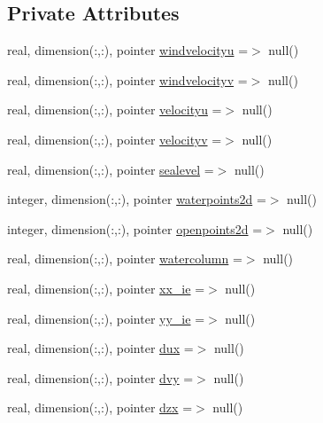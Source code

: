 \subsection*{Private Attributes}
\begin{DoxyCompactItemize}
\item 
real, dimension(\+:,\+:), pointer \mbox{\hyperlink{structmodulewaves_1_1t__external_ad495e0b450968a950cf15204f30f956c}{windvelocityu}} =$>$ null()
\item 
real, dimension(\+:,\+:), pointer \mbox{\hyperlink{structmodulewaves_1_1t__external_acf2611a1417aa702b38dc6164479e6f7}{windvelocityv}} =$>$ null()
\item 
real, dimension(\+:,\+:), pointer \mbox{\hyperlink{structmodulewaves_1_1t__external_a7216cc633e419c3c1b6240ae25a0aed1}{velocityu}} =$>$ null()
\item 
real, dimension(\+:,\+:), pointer \mbox{\hyperlink{structmodulewaves_1_1t__external_a186ce44dd9be393561f85a4c2bfd91ed}{velocityv}} =$>$ null()
\item 
real, dimension(\+:,\+:), pointer \mbox{\hyperlink{structmodulewaves_1_1t__external_a30acead5b498602f77bab4ba5929d0b0}{sealevel}} =$>$ null()
\item 
integer, dimension(\+:,\+:), pointer \mbox{\hyperlink{structmodulewaves_1_1t__external_ac3588246a56eef15ca256f020da131d5}{waterpoints2d}} =$>$ null()
\item 
integer, dimension(\+:,\+:), pointer \mbox{\hyperlink{structmodulewaves_1_1t__external_af8da2002ebdfa56d8f32776a7b435b10}{openpoints2d}} =$>$ null()
\item 
real, dimension(\+:,\+:), pointer \mbox{\hyperlink{structmodulewaves_1_1t__external_aaaf4ed75d6c7c769850d44605832450f}{watercolumn}} =$>$ null()
\item 
real, dimension(\+:,\+:), pointer \mbox{\hyperlink{structmodulewaves_1_1t__external_ab2906c8d9d07cfe6724fce3bc7b3cdab}{xx\+\_\+ie}} =$>$ null()
\item 
real, dimension(\+:,\+:), pointer \mbox{\hyperlink{structmodulewaves_1_1t__external_aeb3f9b379d4f0a2e0db96c8a1f8d540d}{yy\+\_\+ie}} =$>$ null()
\item 
real, dimension(\+:,\+:), pointer \mbox{\hyperlink{structmodulewaves_1_1t__external_a96127c45df51c6130a779747cde77c3a}{dux}} =$>$ null()
\item 
real, dimension(\+:,\+:), pointer \mbox{\hyperlink{structmodulewaves_1_1t__external_a43ae757976403fd74f804944b08faa4a}{dvy}} =$>$ null()
\item 
real, dimension(\+:,\+:), pointer \mbox{\hyperlink{structmodulewaves_1_1t__external_acbc7c617d9abd1549266d012d940a5e1}{dzx}} =$>$ null()

\end{DoxyCompactItemize}
